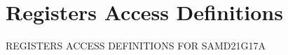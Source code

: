 \hypertarget{group___s_a_m_d21_g17_a__reg}{}\section{Registers Access Definitions}
\label{group___s_a_m_d21_g17_a__reg}
R\+E\+G\+I\+S\+T\+E\+RS A\+C\+C\+E\+SS D\+E\+F\+I\+N\+I\+T\+I\+O\+NS F\+OR S\+A\+M\+D21\+G17A 